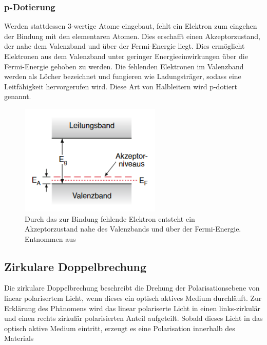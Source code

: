              \FloatBarrier



            \subsubsection*{p-Dotierung}
            Werden stattdessen 3-wertige Atome eingebaut, fehlt ein Elektron zum eingehen der Bindung mit den elementaren Atomen. Dies erschafft einen Akzeptorzustand, der nahe dem Valenzband und über der 
            Fermi-Energie liegt. Dies ermöglicht Elektronen aus dem Valenzband unter geringer Energieeinwirkungen über die Fermi-Energie gehoben zu werden. Die fehlenden Elektronen im Valenzband werden als 
            Löcher bezeichnet und fungieren wie Ladungsträger, sodass eine Leitfähigkeit hervorgerufen wird. Diese Art von Halbleitern wird p-dotiert genannt.

            \FloatBarrier

            \begin{figure}[h]
                \centering
                \includegraphics[width = 0.6\textwidth]{pictures/akzeptor.png}
                \caption{Durch das zur Bindung fehlende Elektron entsteht ein Akzeptorzustand nahe des Valenzbands und über der Fermi-Energie. Entnommen aus \cite{demtroder_atome_2016}}
                \label{fig:Akzeptor}
            \end{figure}
    
            \FloatBarrier


    \subsection{Zirkulare Doppelbrechung}
        Die zirkulare Doppelbrechung beschreibt die Drehung der Polarisationsebene von linear polarisertem Licht, wenn dieses ein optisch aktives Medium durchläuft. Zur Erklärung des Phänomens wird das linear 
        polariserte Licht in einen links-zirkulär und einen rechts zirkulär polarisierten Anteil aufgeteilt. Sobald dieses Licht in das optisch aktive Medium eintritt, erzeugt es eine Polarisation
        innerhalb des Materials

